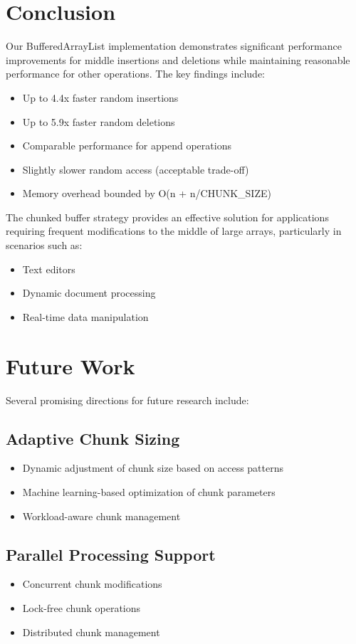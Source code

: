 \section{Conclusion}
Our BufferedArrayList implementation demonstrates significant performance improvements for middle insertions and deletions while maintaining reasonable performance for other operations. The key findings include:

\begin{itemize}
    \item Up to 4.4x faster random insertions
    \item Up to 5.9x faster random deletions
    \item Comparable performance for append operations
    \item Slightly slower random access (acceptable trade-off)
    \item Memory overhead bounded by O(n + n/CHUNK\_SIZE)
\end{itemize}

The chunked buffer strategy provides an effective solution for applications requiring frequent modifications to the middle of large arrays, particularly in scenarios such as:
\begin{itemize}
    \item Text editors
    \item Dynamic document processing
    \item Real-time data manipulation
\end{itemize}

\section{Future Work}
Several promising directions for future research include:

\subsection{Adaptive Chunk Sizing}
\begin{itemize}
    \item Dynamic adjustment of chunk size based on access patterns
    \item Machine learning-based optimization of chunk parameters
    \item Workload-aware chunk management
\end{itemize}

\subsection{Parallel Processing Support}
\begin{itemize}
    \item Concurrent chunk modifications
    \item Lock-free chunk operations
    \item Distributed chunk management
\end{itemize}

